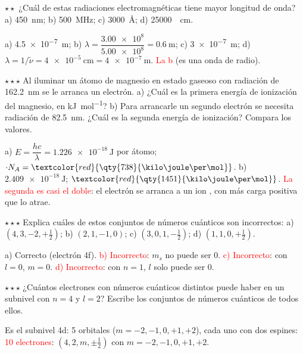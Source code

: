 \begin{exercise}
    \(\star\star\) ¿Cuál de estas radiaciones electromagnéticas tiene mayor longitud de onda? a) \qty{450}{\nm}; b) \qty{500}{\mega\hertz};
    c) \qty{3000}{\angstrom}; d) \qty{25000}{\per\cm}.
    \begin{solu}
        a) \qty{4.5e-7}{\m}; b) \(\lambda = \dfrac{\num{3.00e8}}{\num{5.00e8}} = \qty{0.6}{\m}\); c) \qty{3e-7}{\m}; d)
        \(\lambda = 1/\tilde{\nu} = \qty{4e-5}{\cm} = \qty{4e-7}{\m}\). \textcolor{red}{La b} (es una onda de radio).
    \end{solu}
\end{exercise}

\begin{exercise}
    \(\star\star\star\) Al iluminar un átomo de magnesio en estado gaseoso con radiación de \qty{162.2}{\nm} se le arranca un
    electrón. a) ¿Cuál es la primera energía de ionización del magnesio, en \unit{\kilo\joule\per\mol}? b) Para arrancarle un
    segundo electrón se necesita radiación de \qty{82.5}{\nm}. ¿Cuál es la segunda energía de ionización? Compara los valores.
    \begin{solu}
        a) \(E = \dfrac{h c}{\lambda} = \qty{1.226e-18}{\joule}\) por átomo; \(\cdot N_A = \textcolor{red}{\qty{738}{\kilo\joule\per\mol}}\).
        b) \(\qty{2.409e-18}{\joule}\); \(\textcolor{red}{\qty{1451}{\kilo\joule\per\mol}}\). \textcolor{red}{La segunda es casi
        el doble}: el electrón se arranca a un ion , con más carga positiva que lo atrae.
    \end{solu}
\end{exercise}

\begin{exercise}
    \(\star\star\star\) Explica cuáles de estos conjuntos de números cuánticos son incorrectos: a) \((4, 3, -2, +\frac{1}{2})\);
    b) \((2, 1, -1, 0)\); c) \((3, 0, 1, -\frac{1}{2})\); d) \((1, 1, 0, +\frac{1}{2})\).
    \begin{solu}
        a) Correcto (electrón 4f). \textcolor{red}{b) Incorrecto}: \(m_s\) no puede ser 0. \textcolor{red}{c) Incorrecto}: con
        \(l = 0\), \(m = 0\). \textcolor{red}{d) Incorrecto}: con \(n = 1\), \(l\) solo puede ser 0.
    \end{solu}
\end{exercise}

\begin{exercise}
    \(\star\star\star\) ¿Cuántos electrones con números cuánticos distintos puede haber en un subnivel con \(n = 4\) y \(l = 2\)?
    Escribe los conjuntos de números cuánticos de todos ellos.
    \begin{solu}
        Es el subnivel 4d: 5 orbitales (\(m = -2, -1, 0, +1, +2\)), cada uno con dos espines: \textcolor{red}{10 electrones}:
        \((4, 2, m, \pm\frac{1}{2})\) con \(m = -2, -1, 0, +1, +2\).
    \end{solu}
\end{exercise}

